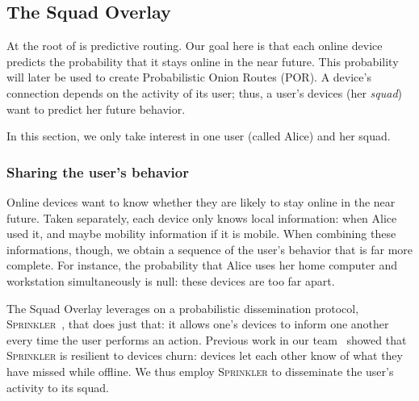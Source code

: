 \subsection{The Squad Overlay} 
\label{sec:squad_overlay}

At the root of \name is predictive routing.
Our goal here is that each online device predicts the probability that it stays online in the near future.
This probability will later be used to create Probabilistic Onion Routes (POR).
A device's connection depends on the activity of its user; thus, a user's devices (her \emph{squad}) want to predict her future behavior.

In this section, we only take interest in one user (called Alice) and her squad.



\subsubsection{Sharing the user's behavior} %
\label{sub:sharing_knowledge}

Online devices want to know whether they are likely to stay online in the near future.
Taken separately, each device only knows local information: when Alice used it, and maybe mobility information if it is mobile.
When combining these informations, though, we obtain a sequence of the user's behavior that is far more complete.
For instance, the probability that Alice uses her home computer and workstation simultaneously is null: these devices are too far apart.

The Squad Overlay leverages on a probabilistic dissemination protocol, \textsc{Sprinkler}~\cite{luxey:hal-01704172}, that does just that: 
it allows one's devices to inform one another every time the user performs an action.
Previous work in our team~\cite{luxey:cascade} showed that \textsc{Sprinkler} is resilient to devices churn: 
devices let each other know of what they have missed while offline.
We thus employ \textsc{Sprinkler} to disseminate the user's activity to its squad.

